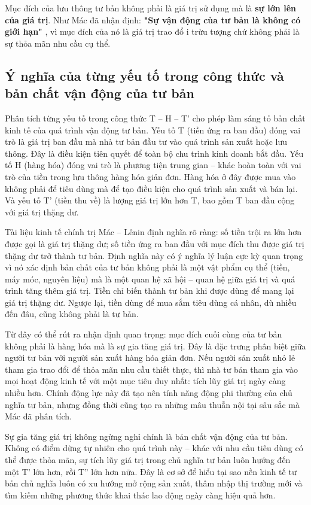 Mục đích của lưu thông tư bản không phải là giá trị sử dụng mà là \textbf{sự lớn lên của giá trị}. Như Mác đã nhận định: \textbf{"Sự vận động của tư bản là không có giới hạn"} \cite[trang 234]{marx_engels_23}, vì mục đích của nó là giá trị trao đổ
i trừu tượng chứ không phải là sự thỏa mãn nhu cầu cụ thể.

\subsection{Ý nghĩa của từng yếu tố trong công thức và bản chất vận động của tư bản}
Phân tích từng yếu tố trong công thức T – H – T' cho phép làm sáng tỏ bản chất kinh tế của quá trình vận động tư bản. Yếu tố T (tiền ứng ra ban đầu) đóng vai trò là giá trị ban đầu mà nhà tư bản đầu tư vào quá trình sản xuất hoặc lưu thông. Đây là điều kiện tiên quyết để toàn bộ chu trình kinh doanh bắt đầu. Yếu tố H (hàng hóa) đóng vai trò là phương tiện trung gian – khác hoàn toàn với vai trò của tiền trong lưu thông hàng hóa giản đơn. Hàng hóa ở đây được mua vào không phải để tiêu dùng mà để tạo điều kiện cho quá trình sản xuất và bán lại. Và yếu tố T' (tiền thu về) là lượng giá trị lớn hơn T, bao gồm T ban đầu cộng với giá trị thặng dư.

Tài liệu kinh tế chính trị Mác – Lênin định nghĩa rõ ràng: số tiền trội ra lớn hơn được gọi là giá trị thặng dư; số tiền ứng ra ban đầu với mục đích thu được giá trị thặng dư trở thành tư bản. Định nghĩa này có ý nghĩa lý luận cực kỳ quan trọng vì nó xác định bản chất của tư bản không phải là một vật phẩm cụ thể (tiền, máy móc, nguyên liệu) mà là một quan hệ xã hội – quan hệ giữa giá trị và quá trình tăng thêm giá trị. Tiền chỉ biến thành tư bản khi được dùng để mang lại giá trị thặng dư. Ngược lại, tiền dùng để mua sắm tiêu dùng cá nhân, dù nhiều đến đâu, cũng không phải là tư bản.

Từ đây có thể rút ra nhận định quan trọng: mục đích cuối cùng của tư bản không phải là hàng hóa mà là sự gia tăng giá trị. Đây là đặc trưng phân biệt giữa người tư bản với người sản xuất hàng hóa giản đơn. Nếu người sản xuất nhỏ lẻ tham gia trao đổi để thỏa mãn nhu cầu thiết thực, thì nhà tư bản tham gia vào mọi hoạt động kinh tế với một mục tiêu duy nhất: tích lũy giá trị ngày càng nhiều hơn. Chính động lực này đã tạo nên tính năng động phi thường của chủ nghĩa tư bản, nhưng đồng thời cũng tạo ra những mâu thuẫn nội tại sâu sắc mà Mác đã phân tích.

Sự gia tăng giá trị không ngừng nghỉ chính là bản chất vận động của tư bản. Không có điểm dừng tự nhiên cho quá trình này – khác với nhu cầu tiêu dùng có thể được thỏa mãn, sự tích lũy giá trị trong chủ nghĩa tư bản luôn hướng đến một T' lớn hơn, rồi T'' lớn hơn nữa. Đây là cơ sở để hiểu tại sao nền kinh tế tư bản chủ nghĩa luôn có xu hướng mở rộng sản xuất, thâm nhập thị trường mới và tìm kiếm những phương thức khai thác lao động ngày càng hiệu quả hơn.

